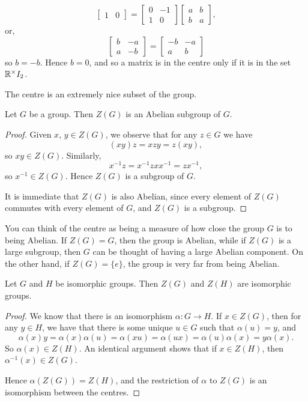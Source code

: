 \begin{example}
\[\begin{bmatrix}
      1 & 0
    \end{bmatrix}
    =
    \begin{bmatrix}
      0 & -1 \\
      1 & 0
    \end{bmatrix}
    \begin{bmatrix}
      a & b \\
      b & a
    \end{bmatrix},
  \]
  or,
  \[
    \begin{bmatrix}
      b & -a \\
      a & -b
    \end{bmatrix}
    =
    \begin{bmatrix}
      -b & -a \\
      a & b
    \end{bmatrix}
  \]
  so $b = -b$.  Hence $b = 0$, and so a matrix is in the centre only if it
  is in the set $\mathbb{R}^{\times}I_{2}$.
\end{example}

The centre is an extremely nice subset of the group.

\begin{proposition}\label{prop:centresubgroup}
  Let $G$ be a group.  Then $Z(G)$ is an Abelian subgroup of $G$.
\end{proposition}
\begin{proof}
  Given $x$, $y \in Z(G)$, we observe that for any $z \in G$ we have
  \[
    (xy)z = xzy = z(xy),
  \]
  so $xy \in Z(G)$.  Similarly,
  \[
    x^{-1}z = x^{-1}zxx^{-1} = zx^{-1},
  \]
  so $x^{-1} \in Z(G)$.  Hence $Z(G)$ is a subgroup of $G$.
  
  It is immediate that $Z(G)$ is also Abelian, since every element of $Z(G)$ 
  commutes with every element of $G$, and $Z(G)$ is a subgroup.
\end{proof}

You can think of the centre as being a measure of how close the group $G$ is
to being Abelian.  If $Z(G) = G$, then the group is Abelian, while if $Z(G)$
is a large subgroup, then $G$ can be thought of having a large Abelian
component.  On the other hand, if $Z(G) = \{e\}$, the group is very far from
being Abelian.

\begin{proposition}
  Let $G$ and $H$ be isomorphic groups.  Then $Z(G)$ and $Z(H)$ are
  isomorphic groups.
\end{proposition}
\begin{proof}
  We know that there is an isomorphism $\alpha : G \to H$.  If $x \in Z(G)$,
  then for any $y \in H$, we have that there is some unique $u \in G$ such
  that $\alpha(u) = y$, and
  \[
    \alpha(x)y = \alpha(x)\alpha(u) = \alpha(xu) = \alpha(ux) =
    \alpha(u)\alpha(x) = y\alpha(x).
  \]
  So $\alpha(x) \in Z(H)$.  An identical argument shows that if $x \in
  Z(H)$, then $\alpha^{-1}(x) \in Z(G)$.
  
  Hence $\alpha(Z(G)) = Z(H)$, and the restriction of $\alpha$ to $Z(G)$ is
  an isomorphism between the centres.
\end{proof}

